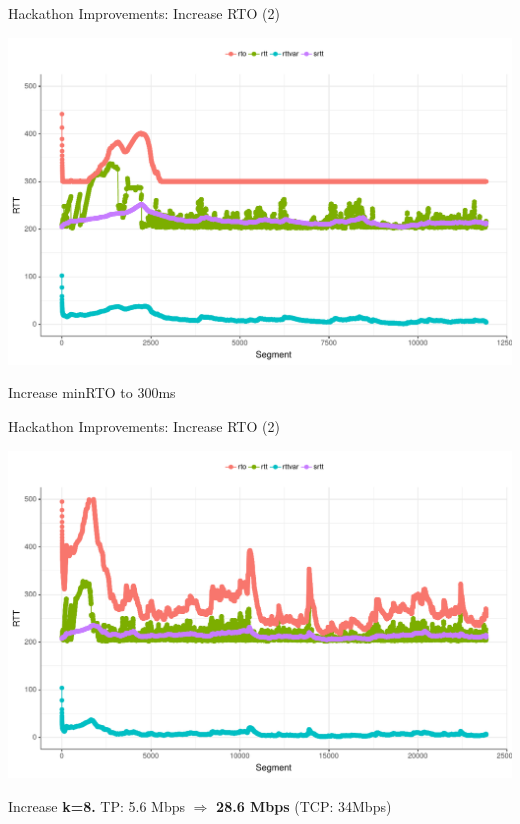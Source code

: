 \begin{frame}[fragile]{Hackathon Improvements: Increase RTO (2)}

\includegraphics[width=\linewidth]{images/rtt_rto300ms.pdf}

Increase minRTO to 300ms

\end{frame}


\begin{frame}[fragile]{Hackathon Improvements: Increase RTO (2)}

\includegraphics[width=\linewidth]{images/rtt_k8.pdf}

Increase \textbf{k=8.} 
TP:  5.6 Mbps $\Rightarrow$ \textbf{28.6 Mbps} (TCP: 34Mbps)

\end{frame}



